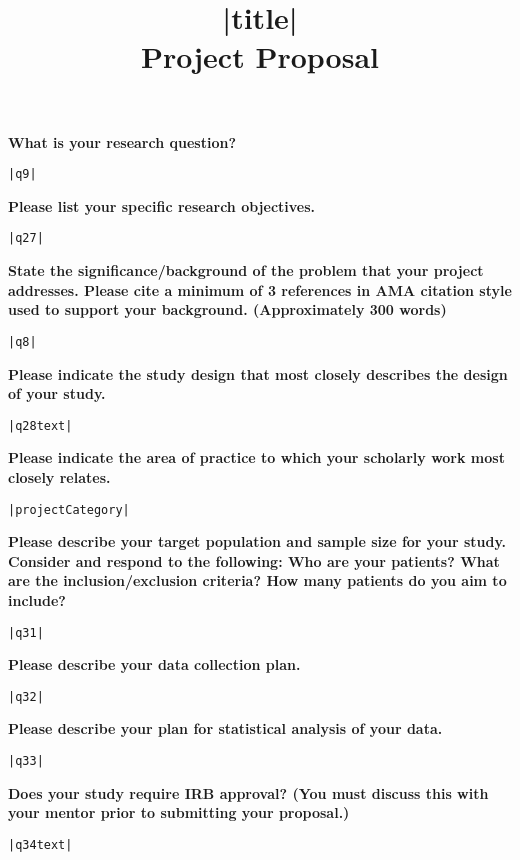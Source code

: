\documentclass[11pt]{article}
\title{\vspace{3in}|title|
\\{\small Project Proposal}}
\affil[]{}
\date{}
\begin{document}
\maketitle
\thispagestyle{fancyfirst}
\pagebreak

{\bfseries What is your research question?}
\begin{lstlisting}[mathescape]
|q9|
\end{lstlisting}
\hfill

{\bfseries Please list your specific research objectives.}
\begin{lstlisting}[mathescape]
|q27|
\end{lstlisting}
\hfill

{\bfseries State the significance/background of the problem that your project addresses. Please cite a minimum of 3 references in AMA citation style used to support your background. (Approximately 300 words)}
\begin{lstlisting}[mathescape]
|q8|
\end{lstlisting}
\hfill

{\bfseries Please indicate the study design that most closely describes the design of your study.}
\begin{lstlisting}[mathescape]
|q28text|
\end{lstlisting}
\hfill

{\bfseries Please indicate the area of practice to which your scholarly work most closely relates.}
\begin{lstlisting}[mathescape]
|projectCategory|
\end{lstlisting}
\hfill

{\bfseries Please describe your target population and sample size for your study. Consider and respond to the following: Who are your patients? What are the inclusion/exclusion criteria? How many patients do you aim to include?}
\begin{lstlisting}[mathescape]
|q31|
\end{lstlisting}
\hfill

{\bfseries Please describe your data collection plan.}
\begin{lstlisting}[mathescape]
|q32|
\end{lstlisting}
\hfill

{\bfseries Please describe your plan for statistical analysis of your data.}
\begin{lstlisting}[mathescape]
|q33|
\end{lstlisting}
\hfill

{\bfseries Does your study require IRB approval? (You must discuss this with your mentor prior to submitting your proposal.)}
\begin{lstlisting}[mathescape]
|q34text|
\end{lstlisting}
\hfill
\end{document}
